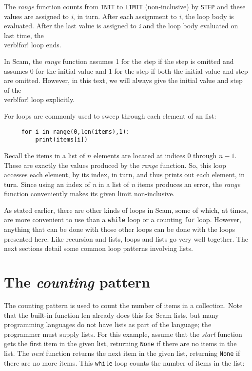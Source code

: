 The {\it range} function counts from
{\tt INIT} to {\tt LIMIT} (non-inclusive)
by {\tt STEP} and these
values are assigned
to {\it i}, in turn. After each assignment to {\it i},
the loop body is evaluated.
After the last value is assigned to {\it i} and the
loop body evaluated on last time, the \\verb!for! loop ends.

In Scam, the {\it range} function assumes 1 for the step
if the step is omitted and assumes 0 for the initial
value and 1 for the step if both the initial value and
step are omitted.
However, in this text, we will always give the initial
value and step of the \\verb!for! loop explicitly.

For loops are commonly used to sweep through each element of an list:

\begin{verbatim}
     for i in range(0,len(items),1):
         print(items[i]) 
\end{verbatim}

Recall the items in a list of $n$ elements are located at
indices $0$ through $n - 1$. These are exactly the values
produced by the {\it range} function. So, this loop accesses
each element, by its index, in turn, and thus prints out
each element, in turn.
Since using an index of {\it n} in a list of {\it n} items produces an
error, the {\it range} function conveniently makes its given
limit non-inclusive.

As stated earlier, there are other kinds of loops in
Scam, some of which, at times, are more convenient
to use than a {\tt while} loop or a counting {\tt for} loop. However,
anything that can be done with those other loops can be
done with the loops presented here.
Like recursion and lists, loops and lists go very well
together.
The next sections detail some common loop patterns involving
lists.

\section{The {\it counting} pattern}

The counting pattern is used to count the number of items
in a collection. Note that the built-in function len already
does this for Scam lists, but many programming languages
do not have lists as part of the language; the programmer
must supply lists. For this example, assume that the {\it start}
function gets the first item in the given list,
returning {\tt None}
if there are no items in the list. The {\it next}
function returns the next item in the given list,
returning {\tt None}
if there are no more items. This {\tt while} loop counts the number
of items in the list:

